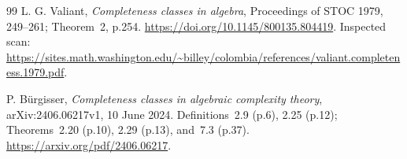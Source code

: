\documentclass[11pt,a4paper]{article}
\begin{document}
\begin{thebibliography}{99}
L. G. Valiant, \emph{Completeness classes in algebra},
Proceedings of STOC 1979, 249--261; Theorem~2, p.254.
\url{https://doi.org/10.1145/800135.804419}.
Inspected scan:
\url{https://sites.math.washington.edu/~billey/colombia/references/valiant.completeness.1979.pdf}.



P. B\"urgisser, \emph{Completeness classes in algebraic complexity theory},
arXiv:2406.06217v1, 10 June 2024.
Definitions~2.9 (p.6), 2.25 (p.12);
Theorems~2.20 (p.10), 2.29 (p.13), and~7.3 (p.37).
\url{https://arxiv.org/pdf/2406.06217}.


\end{thebibliography}
\end{document}
